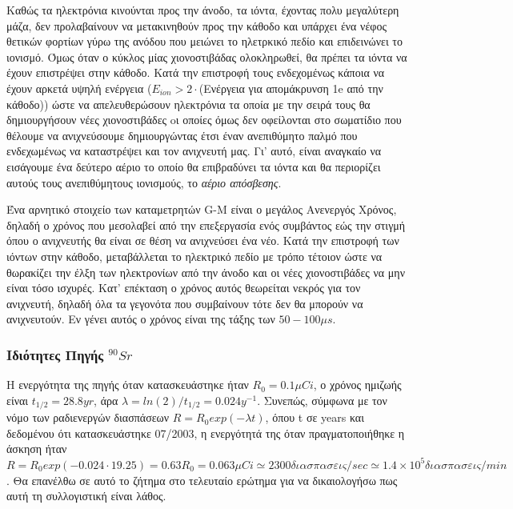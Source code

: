 \documentclass[a4paper]{article}
\begin{document}
	Καθώς τα ηλεκτρόνια κινούνται προς την άνοδο, τα ιόντα, έχοντας πολυ μεγαλύτερη μάζα, δεν προλαβαίνουν να μετακινηθούν προς την κάθοδο και υπάρχει ένα νέφος θετικών φορτίων γύρω της ανόδου που μειώνει το ηλετρκικό πεδίο και επιδεινώνει το ιονισμό. Όμως όταν ο κύκλος μίας χιονοστιβάδας ολοκληρωθεί, θα πρέπει τα ιόντα να έχουν επιστρέψει στην κάθοδο. Κατά την επιστροφή τους ενδεχομένως κάποια να έχουν αρκετά υψηλή ενέργεια ($E_{ion} > 2\cdot$(Ενέργεια για απομάκρυνση 1e από την κάθοδο))  ώστε να απελευθερώσουν ηλεκτρόνια τα οποία με την σειρά τους θα δημιουργήσουν νέες χιονοστιβάδες oι οποίες όμως δεν οφείλονται στο σωματίδιο που θέλουμε να ανιχνεύσουμε δημιουργώντας έτσι έναν ανεπιθύμητο παλμό που ενδεχωμένως να καταστρέψει και τον ανιχνευτή μας. Γι' αυτό, είναι αναγκαίο να εισάγουμε ένα δεύτερο αέριο το οποίο θα επιβραδύνει τα ιόντα και θα περιορίζει αυτούς τους ανεπιθύμητους ιονισμούς, το \textit{αέριο απόσβεσης}.
	
	Ένα αρνητικό στοιχείο των καταμετρητών G-Μ είναι ο μεγάλος Ανενεργός Χρόνος, δηλαδή ο χρόνος που μεσολαβεί από την επεξεργασία ενός συμβάντος εώς την στιγμή όπου ο ανιχνευτής θα είναι σε θέση να ανιχνεύσει ένα νέο. 
	Κατά την επιστροφή των ιόντων στην κάθοδο, μεταβάλλεται το ηλεκτρικό πεδίο με τρόπο τέτοιον ώστε να θωρακίζει την έλξη των ηλεκτρονίων από την άνοδο και οι νέες χιονοστιβάδες να μην είναι τόσο ισχυρές. %
	Κατ' επέκταση ο χρόνος αυτός θεωρείται νεκρός για τον ανιχνευτή, δηλαδή όλα τα γεγονότα που συμβαίνουν τότε δεν θα μπορούν να ανιχνευτούν. Εν γένει αυτός ο χρόνος είναι της τάξης των $50-100\mu s$.
 		
 		\subsubsection*{Ιδιότητες Πηγής $^{90}Sr$}
 		
 		
	Η ενεργότητα της πηγής όταν κατασκευάστηκε ήταν $R_0=0.1\mu Ci$, ο χρόνος ημιζωής είναι $t_{1/2}=28.8yr$, άρα $\lambda=ln(2)/t_{1/2} =0.024y^{-1}$. Συνεπώς, σύμφωνα με τον νόμο των ραδιενεργών διασπάσεων $R = R_0 exp(-\lambda t)$, όπου t σε years και δεδομένου ότι κατασκευάστηκε 07/2003, η ενεργότητά της όταν πραγματοποιήθηκε η άσκηση ήταν $R =R_0exp(-0.024\cdot 19.25) =  0.63R_0 = 0.063\mu Ci\simeq2300 διασπασεις/sec \simeq 1.4\times10^5 διασπασεις/min$.
	Θα επανέλθω σε αυτό το ζήτημα στο τελευταίο ερώτημα για να δικαιολογήσω πως αυτή τη συλλογιστική είναι λάθος.	
	
	
\end{document}
